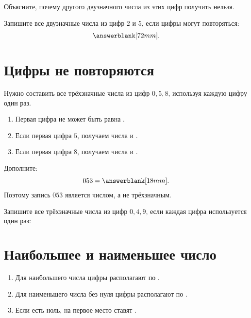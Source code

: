 \begin{thinkbox}
  Объясните, почему другого двузначного числа из этих цифр получить нельзя.
\end{thinkbox}

\begin{practicebox}
  Запишите все двузначные числа из цифр \(2\) и \(5\), если цифры могут
  повторяться:
  \[
    \answerblank[72mm].
  \]
\end{practicebox}

\section{Цифры не повторяются}

Нужно составить все трёхзначные числа из цифр \(0,5,8\), используя каждую
цифру один раз.

\norepeattreefigure

\begin{fillbox}
  \begin{enumerate}
    \item Первая цифра не может быть равна \answerblank[12mm].
    \item Если первая цифра \(5\), получаем числа
      \answerblank[18mm] и \answerblank[18mm].
    \item Если первая цифра \(8\), получаем числа
      \answerblank[18mm] и \answerblank[18mm].
  \end{enumerate}
\end{fillbox}

\begin{warningbox}
  Дополните:
  \[
    053=\answerblank[18mm].
  \]
  Поэтому запись \(053\) является \answerblank[28mm] числом, а не
  трёхзначным.
\end{warningbox}

\begin{practicebox}
  Запишите все трёхзначные числа из цифр \(0,4,9\), если каждая цифра
  используется один раз:
\end{practicebox}

\section{Наибольшее и наименьшее число}

\largestsmallestfigure

\begin{fillbox}
  \begin{enumerate}
    \item Для наибольшего числа цифры располагают по
      \answerblank[28mm].
    \item Для наименьшего числа без нуля цифры располагают по
      \answerblank[28mm].
    \item Если есть ноль, на первое место ставят
      \answerblank[48mm].
  \end{enumerate}
\end{fillbox}

